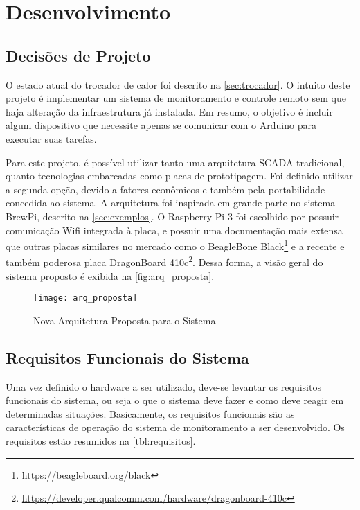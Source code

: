 \chapter{Desenvolvimento}
	
	\section{Decisões de Projeto}
		O estado atual do trocador de calor foi descrito na \autoref{sec:trocador}. O intuito deste projeto é implementar um sistema de monitoramento e controle remoto sem que haja alteração da infraestrutura já instalada. Em resumo, o objetivo é incluir algum dispositivo que necessite apenas se comunicar com o Arduino para executar suas tarefas.
		
		Para este projeto, é possível utilizar tanto uma arquitetura SCADA tradicional, quanto tecnologias embarcadas como placas de prototipagem. Foi definido utilizar a segunda opção, devido a fatores econômicos e também pela portabilidade concedida ao sistema. A arquitetura foi inspirada em grande parte no sistema BrewPi, descrito na \autoref{sec:exemplos}. O Raspberry Pi 3 foi escolhido por possuir comunicação Wifi integrada à placa, e possuir uma documentação mais extensa que outras placas similares no mercado como o BeagleBone Black\footnote{\url{https://beagleboard.org/black}} e a recente e também poderosa placa DragonBoard 410c\footnote{\url{https://developer.qualcomm.com/hardware/dragonboard-410c}}. Dessa forma, a visão geral do sistema proposto é exibida na \autoref{fig:arq_proposta}.
		
		\begin{figure}[!htb]	
			\captionsetup{justification=centering}
			\begin{center}
				\texttt{[image: arq\_proposta]}  %
				\caption[Nova Arquitetura Proposta para o Sistema]{\label{fig:arq_proposta} Nova Arquitetura Proposta para o Sistema }
			\end{center}	
		\end{figure}
	
	\section{Requisitos Funcionais do Sistema}
		Uma vez definido o hardware a ser utilizado, deve-se levantar os requisitos funcionais do sistema, ou seja o que o sistema deve fazer e como deve reagir em determinadas situações. Basicamente, os requisitos funcionais são as características de operação do sistema de monitoramento a ser desenvolvido. Os requisitos estão resumidos na \autoref{tbl:requisitos}.
			
